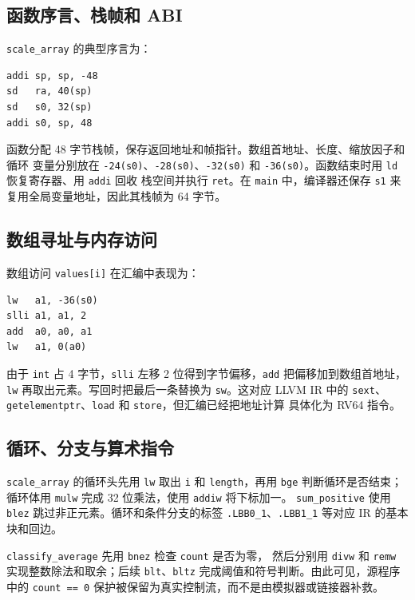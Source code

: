 \documentclass[a4paper]{article}
\begin{document}
\subsection{函数序言、栈帧和 ABI}

\texttt{scale\_array} 的典型序言为：

\begin{lstlisting}[language={},caption={scale\_array 的函数序言}]
addi sp, sp, -48
sd   ra, 40(sp)
sd   s0, 32(sp)
addi s0, sp, 48
\end{lstlisting}

函数分配 48 字节栈帧，保存返回地址和帧指针。数组首地址、长度、缩放因子和循环
变量分别放在 \texttt{-24(s0)}、\texttt{-28(s0)}、\texttt{-32(s0)} 和
\texttt{-36(s0)}。函数结束时用 \texttt{ld} 恢复寄存器、用 \texttt{addi} 回收
栈空间并执行 \texttt{ret}。在 \texttt{main} 中，编译器还保存 \texttt{s1} 来
复用全局变量地址，因此其栈帧为 64 字节。

\subsection{数组寻址与内存访问}

数组访问 \texttt{values[i]} 在汇编中表现为：

\begin{lstlisting}[language={},caption={values[i] 的 RISC-V 地址计算}]
lw   a1, -36(s0)
slli a1, a1, 2
add  a0, a0, a1
lw   a1, 0(a0)
\end{lstlisting}

由于 \texttt{int} 占 4 字节，\texttt{slli} 左移 2 位得到字节偏移，\texttt{add}
把偏移加到数组首地址，\texttt{lw} 再取出元素。写回时把最后一条替换为
\texttt{sw}。这对应 LLVM IR 中的 \texttt{sext}、
\texttt{getelementptr}、\texttt{load} 和 \texttt{store}，但汇编已经把地址计算
具体化为 RV64 指令。

\subsection{循环、分支与算术指令}

\texttt{scale\_array} 的循环头先用 \texttt{lw} 取出 \texttt{i} 和
\texttt{length}，再用 \texttt{bge} 判断循环是否结束；循环体用
\texttt{mulw} 完成 32 位乘法，使用 \texttt{addiw} 将下标加一。
\texttt{sum\_positive} 使用 \texttt{blez} 跳过非正元素。循环和条件分支的标签
\texttt{.LBB0\_1}、\texttt{.LBB1\_1} 等对应 IR 的基本块和回边。

\texttt{classify\_average} 先用 \texttt{bnez} 检查 \texttt{count} 是否为零，
然后分别用 \texttt{divw} 和 \texttt{remw} 实现整数除法和取余；后续
\texttt{blt}、\texttt{bltz} 完成阈值和符号判断。由此可见，源程序中的
\texttt{count == 0} 保护被保留为真实控制流，而不是由模拟器或链接器补救。
\end{document}
